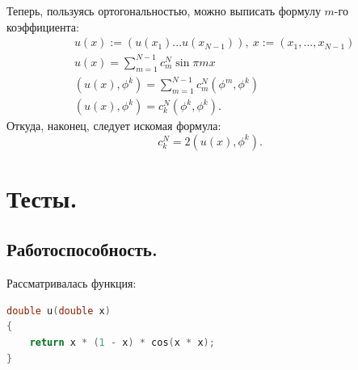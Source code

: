 \documentclass[14pt,a4paper]{extarticle}
\newcommand{\1}{\mathbbm{1}}
\begin{document}
Теперь, пользуясь ортогональностью, можно выписать формулу $m$-го коэффициента:
\begin{align*}
    & u(x) := (u(x_1) ... u(x_{N-1})), \: x := (x_1, ..., x_{N-1})\\
    & u(x) = \sum_{m=1}^{N - 1} c_m^N \sin{\pi m x} \\
    & (u(x), \phi^k) = \sum_{m=1}^{N - 1} c_m^N (\phi^m, \phi^k) \\
    & (u(x), \phi^k) = c_k^N (\phi^k, \phi^k).
\end{align*}
Откуда, наконец, следует искомая формула:
\begin{equation}
    c_k^N = 2 (u(x), \phi^k).
\end{equation}

\section{Тесты.}
\subsection{Работоспособность.}
Рассматривалась функция:
\begin{lstlisting}[language=c++]
    double u(double x)
{
    return x * (1 - x) * cos(x * x);
}
    \end{lstlisting}
\end{document}
